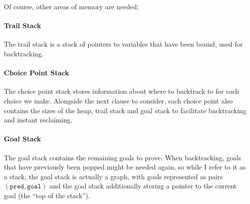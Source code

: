 Of course, other areas of memory are needed:

\paragraph{Trail Stack} The trail stack is a stack of pointers to variables that have been bound, used for backtracking.

\paragraph{Choice Point Stack} The choice point stack stores information about where to backtrack to for each choice we make. Alongside the next clause to consider, each choice point also contains the sizes of the heap, trail stack and goal stack to facilitate backtracking and instant reclaiming.

\paragraph{Goal Stack} The goal stack contains the remaining goals to prove. When backtracking, goals that have previously been popped might be needed again, so while I refer to it as a stack, the goal stack is actually a graph, with goals represented as pairs $(\texttt{pred}, \texttt{goal})$ and the goal stack additionally storing a pointer to the current goal (the ``top of the stack'').

